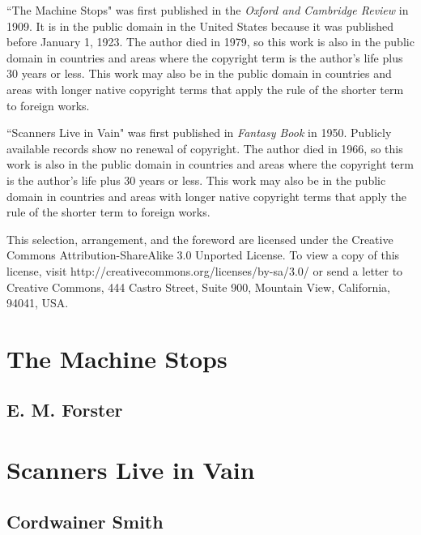\documentclass[12pt]{book}
\begin{document}
\frontmatter
%

``The Machine Stops" was first published in the \textit{Oxford and Cambridge Review} in 1909. It is in the public domain in the United States because it was published before January 1, 1923.
The author died in 1979, so this work is also in the public domain in countries and areas where the copyright term is the author's life plus 30 years or less. This work may also be in the public domain in countries and areas with longer native copyright terms that apply the rule of the shorter term to foreign works.

``Scanners Live in Vain" was first published in \textit{ Fantasy Book} in 1950. Publicly available records show no renewal of copyright. The author died in 1966, so this work is also in the public domain in countries and areas where the copyright term is the author's life plus 30 years or less. This work may also be in the public domain in countries and areas with longer native copyright terms that apply the rule of the shorter term to foreign works.
%

This selection, arrangement, and the foreword are licensed under the Creative Commons At\-trib\-ution-\newline{}Share\-Alike 3.0 Unported License. To view a copy of this license, visit http://creativecommons.org/licenses/by-sa/3.0/ or send a letter to Creative Commons, 444 Castro Street, Suite 900, Mountain View, California, 94041, USA.
\tableofcontents
%

%
\mainmatter
%
\chapter{The Machine Stops}
\thispagestyle{empty}
\section*{\huge \center E. M. Forster}
\newpage
%

%
\chapter{Scanners Live in Vain}
\thispagestyle{empty}
\section*{\huge \center Cordwainer Smith}
\newpage
%

%
%
\end{document}
